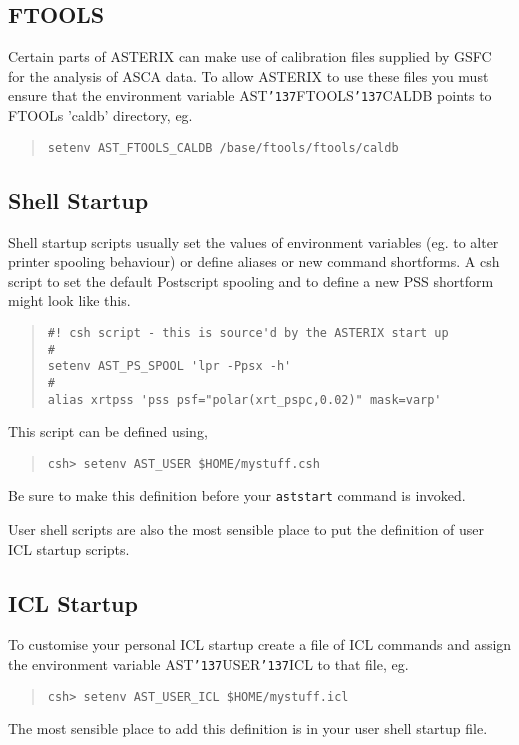 \documentclass{book}
\renewcommand{\_}{{\tt\char'137}}     %
\begin{document}
\subsection{FTOOLS}
Certain parts of ASTERIX can make use of calibration files supplied
by GSFC for the analysis of ASCA data. To allow ASTERIX to use these
files you must ensure that the environment variable AST\_FTOOLS\_CALDB
points to FTOOLs 'caldb' directory, eg.
\begin{quote}\begin{verbatim}
setenv AST_FTOOLS_CALDB /base/ftools/ftools/caldb
\end{verbatim}\end{quote}
\subsection{Shell Startup}
Shell startup scripts usually set the values of environment
variables (eg. to alter printer spooling behaviour) or define
aliases or new command shortforms. A csh script to set the default
Postscript spooling and to define a new PSS shortform might look
like this.
 
\begin{quote}\begin{verbatim}
#! csh script - this is source'd by the ASTERIX start up
#
setenv AST_PS_SPOOL 'lpr -Ppsx -h'
#
alias xrtpss 'pss psf="polar(xrt_pspc,0.02)" mask=varp'
\end{verbatim}\end{quote}
This script can be defined using,
 
\begin{quote}\begin{verbatim}
csh> setenv AST_USER $HOME/mystuff.csh
\end{verbatim}\end{quote}
Be sure to make this definition before your {\tt aststart} command
is invoked.
 
User shell scripts are also the most sensible place to put the
definition of user ICL startup scripts.
 
\subsection{ICL Startup}
To customise your personal ICL startup create a file of ICL commands
and assign the environment variable AST\_USER\_ICL to that file, eg.
\begin{quote}\begin{verbatim}
csh> setenv AST_USER_ICL $HOME/mystuff.icl
\end{verbatim}\end{quote}
The most sensible place to add this definition is in your user shell
startup file.
 
\end{document}
